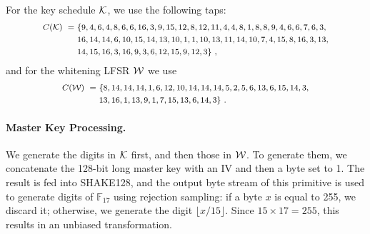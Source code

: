   For the key schedule $\mathcal{K}$, we use the following taps:
  \begin{equation*}
    \footnotesize
    \begin{split}
      C(\mathcal{K}) ~=~& \{9, 4, 6, 4, 8, 6, 6, 16, 3,
                        9, 15, 12, 8, 12, 11, 4, 4, 8, 1,
                        8, 8, 9, 4, 6, 6, 7, 6, 3, \\
                      & 16, 14, 14, 6, 10, 15, 14, 13, 10, 1, 1,
                        10, 13, 11, 14, 10, 7, 4, 15, 8, 16,
                        3, 13, \\
                      & 14, 15, 16, 3, 16, 9, 3, 6,
                        12, 15, 9, 12, 3\}~,
    \end{split}
  \end{equation*}
  and for the whitening LFSR $\mathcal{W}$ we use
  \begin{equation*}
    \footnotesize
    \begin{split}
      C(\mathcal{W}) ~=~& \{8, 14, 14, 14, 1, 6, 12, 10, 14, 14,
                         14, 5, 2, 5, 6, 13, 6, 15, 14, 3, \\
                       & 13, 16, 1, 13, 9, 1, 7, 15, 13, 6,
                         14, 3\}~.
    \end{split}
  \end{equation*}


\paragraph{Master Key Processing.}
We generate the digits in $\mathcal{K}$ first, and then those in $\mathcal{W}$. To generate them, we concatenate the 128-bit long master key with an IV and then a byte set to 1. The result is fed into \textsf{SHAKE128}, and the output byte stream of this primitive is used to generate digits of $\mathbb{F}_{17}$ using rejection sampling: if a byte $x$ is equal to 255, we discard it; otherwise, we generate the digit $\lfloor x / 15 \rfloor$. Since $15 \times 17 = 255$, this results in an unbiased transformation.





